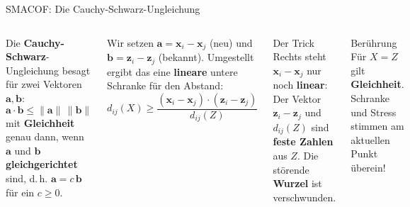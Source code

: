 \begin{frame}{SMACOF: Die Cauchy-Schwarz-Ungleichung}
\footnotesize
\begin{columns}
Die \textbf{Cauchy-Schwarz}-Ungleichung besagt für zwei Vektoren
$\mathbf{a}, \mathbf{b}$:
\[
  \mathbf{a} \cdot \mathbf{b} \leq \lVert \mathbf{a} \rVert\,\lVert \mathbf{b} \rVert
\]
mit \textbf{Gleichheit} genau dann, wenn $\mathbf{a}$ und $\mathbf{b}$
\textbf{gleichgerichtet} sind, d.\,h. $\mathbf{a} = c\,\mathbf{b}$ für ein
$c \geq 0$.

\vspace{0.4em}
Wir setzen $\mathbf{a} = \mathbf{x}_i - \mathbf{x}_j$ (neu) und
$\mathbf{b} = \mathbf{z}_i - \mathbf{z}_j$ (bekannt). Umgestellt ergibt das
eine \textbf{lineare} untere Schranke für den Abstand:
\[
  d_{ij}(X) \geq
  \frac{(\mathbf{x}_i - \mathbf{x}_j)\cdot(\mathbf{z}_i - \mathbf{z}_j)}
       {d_{ij}(Z)}
\]

\begin{blockC3}{\footnotesize Der Trick}
Rechts steht $\mathbf{x}_i - \mathbf{x}_j$ nur noch \textbf{linear}: Der
Vektor $\mathbf{z}_i - \mathbf{z}_j$ und $d_{ij}(Z)$ sind \textbf{feste
Zahlen} aus $Z$. Die störende \textbf{Wurzel} ist verschwunden.
\end{blockC3}

\begin{blockC4}{\footnotesize Berührung}
Für $X = Z$ gilt \textbf{Gleichheit}.  Schranke und Stress stimmen am
aktuellen Punkt überein!
\end{blockC4}
\end{columns}


\end{frame}


